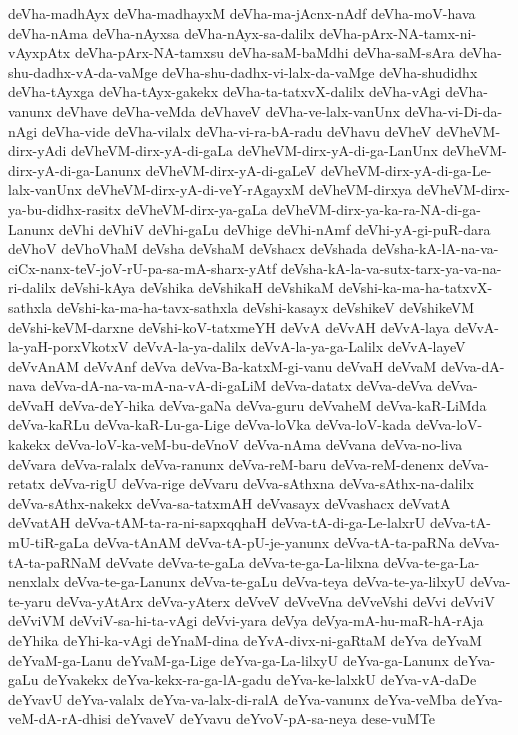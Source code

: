 {deVha-madhAyx
deVha-madhayxM
deVha-ma-jAcnx-nAdf
deVha-moV-hava
deVha-nAma
deVha-nAyxsa
deVha-nAyx-sa-dalilx
deVha-pArx-NA-tamx-ni-vAyxpAtx
deVha-pArx-NA-tamxsu
deVha-saM-baMdhi
deVha-saM-sAra
deVha-shu-dadhx-vA-da-vaMge
deVha-shu-dadhx-vi-lalx-da-vaMge
deVha-shudidhx
deVha-tAyxga
deVha-tAyx-gakekx
deVha-ta-tatxvX-dalilx
deVha-vAgi
deVha-vanunx
deVhave
deVha-veMda
deVhaveV
deVha-ve-lalx-vanUnx
deVha-vi-Di-da-nAgi
deVha-vide
deVha-vilalx
deVha-vi-ra-bA-radu
deVhavu
deVheV
deVheVM-dirx-yAdi
deVheVM-dirx-yA-di-gaLa
deVheVM-dirx-yA-di-ga-LanUnx
deVheVM-dirx-yA-di-ga-Lanunx
deVheVM-dirx-yA-di-gaLeV
deVheVM-dirx-yA-di-ga-Le-lalx-vanUnx
deVheVM-dirx-yA-di-veY-rAgayxM
deVheVM-dirxya
deVheVM-dirx-ya-bu-didhx-rasitx
deVheVM-dirx-ya-gaLa
deVheVM-dirx-ya-ka-ra-NA-di-ga-Lanunx
deVhi
deVhiV
deVhi-gaLu
deVhige
deVhi-nAmf
deVhi-yA-gi-puR-dara
deVhoV
deVhoVhaM
deVsha
deVshaM
deVshacx
deVshada
deVsha-kA-lA-na-va-ciCx-nanx-teV-joV-rU-pa-sa-mA-sharx-yAtf
deVsha-kA-la-va-sutx-tarx-ya-va-na-ri-dalilx
deVshi-kAya
deVshika
deVshikaH
deVshikaM
deVshi-ka-ma-ha-tatxvX-sathxla
deVshi-ka-ma-ha-tavx-sathxla
deVshi-kasayx
deVshikeV
deVshikeVM
deVshi-keVM-darxne
deVshi-koV-tatxmeYH
deVvA
deVvAH
deVvA-laya
deVvA-la-yaH-porxVkotxV
deVvA-la-ya-dalilx
deVvA-la-ya-ga-Lalilx
deVvA-layeV
deVvAnAM
deVvAnf
deVva
deVva-Ba-katxM-gi-vanu
deVvaH
deVvaM
deVva-dA-nava
deVva-dA-na-va-mA-na-vA-di-gaLiM
deVva-datatx
deVva-deVva
deVva-deVvaH
deVva-deY-hika
deVva-gaNa
deVva-guru
deVvaheM
deVva-kaR-LiMda
deVva-kaRLu
deVva-kaR-Lu-ga-Lige
deVva-loVka
deVva-loV-kada
deVva-loV-kakekx
deVva-loV-ka-veM-bu-deVnoV
deVva-nAma
deVvana
deVva-no-liva
deVvara
deVva-ralalx
deVva-ranunx
deVva-reM-baru
deVva-reM-denenx
deVva-retatx
deVva-rigU
deVva-rige
deVvaru
deVva-sAthxna
deVva-sAthx-na-dalilx
deVva-sAthx-nakekx
deVva-sa-tatxmAH
deVvasayx
deVvashacx
deVvatA
deVvatAH
deVva-tAM-ta-ra-ni-sapxqqhaH
deVva-tA-di-ga-Le-lalxrU
deVva-tA-mU-tiR-gaLa
deVva-tAnAM
deVva-tA-pU-je-yanunx
deVva-tA-ta-paRNa
deVva-tA-ta-paRNaM
deVvate
deVva-te-gaLa
deVva-te-ga-La-lilxna
deVva-te-ga-La-nenxlalx
deVva-te-ga-Lanunx
deVva-te-gaLu
deVva-teya
deVva-te-ya-lilxyU
deVva-te-yaru
deVva-yAtArx
deVva-yAterx
deVveV
deVveVna
deVveVshi
deVvi
deVviV
deVviVM
deVviV-sa-hi-ta-vAgi
deVvi-yara
deVya
deVya-mA-hu-maR-hA-rAja
deYhika
deYhi-ka-vAgi
deYnaM-dina
deYvA-divx-ni-gaRtaM
deYva
deYvaM
deYvaM-ga-Lanu
deYvaM-ga-Lige
deYva-ga-La-lilxyU
deYva-ga-Lanunx
deYva-gaLu
deYvakekx
deYva-kekx-ra-ga-lA-gadu
deYva-ke-lalxkU
deYva-vA-daDe
deYvavU
deYva-valalx
deYva-va-lalx-di-ralA
deYva-vanunx
deYva-veMba
deYva-veM-dA-rA-dhisi
deYvaveV
deYvavu
deYvoV-pA-sa-neya
dese-vuMTe
}
